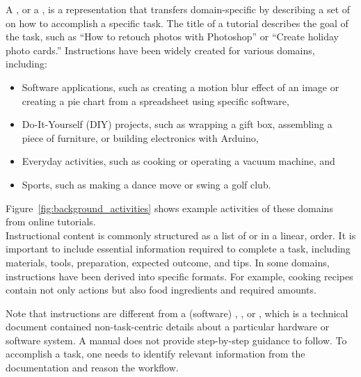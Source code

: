 A , or a , is a representation that transfers domain-specific  by describing a set of  on how to accomplish a specific task.
%
The title of a tutorial describes the goal of the task, such as ``How to retouch photos with Photoshop'' or ``Create holiday photo cards.''
%
Instructions have been widely created for various domains, including:

\begin{itemize}
  \itemsep -2pt
  \item Software applications, such as creating a motion blur effect of an image or creating a pie chart from a spreadsheet using specific software,
  \item Do-It-Yourself (DIY) projects, such as wrapping a gift box, assembling a piece of furniture, or building electronics with Arduino,
  \item Everyday activities, such as cooking or operating a vacuum machine, and
  \item Sports, such as making a dance move or swing a golf club.
\end{itemize}

Figure~\ref{fig:background_activities} shows example activities of these domains from online tutorials.
\\

%
Instructional content is commonly structured as a list of  or  in a linear,  order.
%
It is important to include essential information required to complete a task, including materials, tools, preparation, expected outcome, and tips.
%
In some domains, instructions have been derived into specific formats. For example, cooking recipes contain not only actions but also food ingredients and required amounts.

Note that instructions are different from a (software) , , or , which is a technical document contained non-task-centric details about a particular hardware or software system. A manual does not provide step-by-step guidance to follow. To accomplish a task, one needs to identify relevant information from the documentation and reason the workflow.

